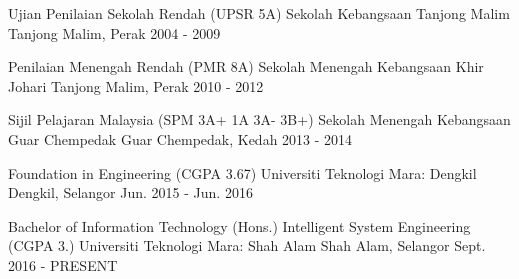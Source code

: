 

\begin{cventries}


\cventry
  {Ujian Penilaian Sekolah Rendah (UPSR 5A)}
  {Sekolah Kebangsaan Tanjong Malim}
  {Tanjong Malim, Perak}
  {2004 - 2009}
  {}

\cventry
  {Penilaian Menengah Rendah (PMR 8A)}
  {Sekolah Menengah Kebangsaan Khir Johari}
  {Tanjong Malim, Perak}
  {2010 - 2012}
  {}
  
 \cventry
  {Sijil Pelajaran Malaysia (SPM 3A+ 1A 3A- 3B+)}
  {Sekolah Menengah Kebangsaan Guar Chempedak}
  {Guar Chempedak, Kedah}
  {2013 - 2014}
  {}

\cventry
  {Foundation in Engineering (CGPA 3.67)}
  {Universiti Teknologi Mara: Dengkil}
  {Dengkil, Selangor}
  {Jun. 2015 - Jun. 2016}
  {}

  \cventry
  {Bachelor of Information Technology (Hons.) Intelligent System Engineering (CGPA 3.)}
  {Universiti Teknologi Mara: Shah Alam}
  {Shah Alam, Selangor}
  {Sept. 2016 - PRESENT}
  {}

\end{cventries}
